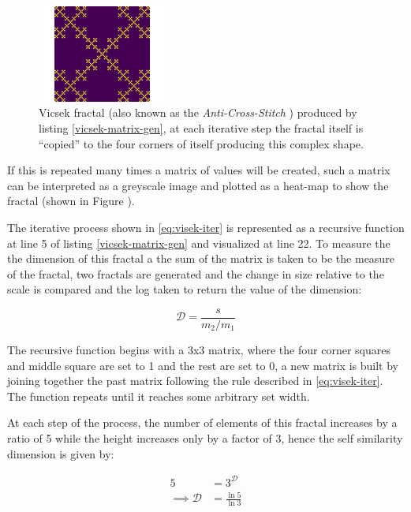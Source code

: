 \documentclass[a4paper,11pt,twoside]{article}
\begin{document}
\begin{figure}
\centering
\includegraphics[width=0.38\textwidth]{media/Vicsek-Fractal.png}
\caption{\label{vicsek-fractal-julia}Vicsek fractal \cite[p. 12]{vicsekFractalGrowthPhenomena1992} (also known as the \emph{Anti-Cross-Stitch} \cite{janwassenaarCantorDust2005}) produced by listing \ref{vicsek-matrix-gen}, at each iterative step the fractal itself is ``copied'' to the four corners of itself producing this complex shape.}
\end{figure}

If this is repeated many times a matrix of values will be created, such a matrix
can be interpreted as a greyscale image and plotted as a heat-map to show the
fractal (shown in Figure ).


The iterative process shown in \eqref{eq:visek-iter} is represented as a recursive function at line 5 of listing \ref{vicsek-matrix-gen} and visualized at line 22. To measure the the dimension of this fractal a the sum of the matrix is taken to be the measure of the fractal, two fractals are generated and the change in size relative to the scale is compared and the log taken to return the value of the dimension:

\[
\mathcal{D} = \frac{s}{m_{2}/m_{1}}
\]

The recursive function begins with a 3x3 matrix, where the four corner squares
and middle square are set to 1 and the rest are set to 0, a new matrix is built
by joining together the past matrix following the rule described in \eqref{eq:visek-iter}.
The function repeats until it reaches some arbitrary set width.





At each step of the process, the number of elements of this fractal increases by
a ratio of 5 while the height increases only by a factor of 3, hence the self
similarity dimension is given by:


\begin{align}
5 &= 3^{\mathcal{D}} \nonumber \\
\implies \mathcal{D} &= \frac{\ln 5}{\ln 3} \label{eq:vic-dim-val}
\end{align}
\end{document}
